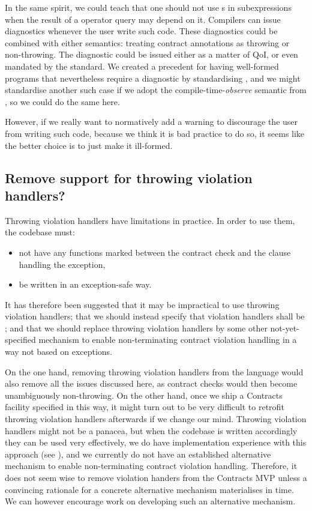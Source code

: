 In the same spirit, we could teach that one should not use s in subexpressions when the result of a  operator query may depend on it. Compilers can issue diagnostics whenever the user write such code. These diagnostics could be combined with either semantics: treating contract annotations as throwing or non-throwing. The diagnostic could be issued either as a matter of QoI, or even mandated by the standard. We created a precedent for having well-formed programs that nevertheless require a diagnostic by standardising , and we might standardise another such case if we adopt the compile-time-\emph{observe} semantic from \cite{P2894R1}, so we could do the same here.

However, if we really want to normatively add a warning to discourage the user from writing such code, because we think it is bad practice to do so, it seems like the better choice is to just make it ill-formed. 

\subsection{Remove support for throwing violation handlers?}

Throwing violation handlers have limitations in practice. In order to use them, the codebase must:
\begin{itemize}
\item not have any functions marked  between the contract check and the  clause handling the exception,
\item be written in an exception-safe way.
\end{itemize}
It has therefore been suggested that it may be impractical to use throwing violation handlers; that we should instead specify that violation handlers shall be ; and that we should replace throwing violation handlers by some other not-yet-specified mechanism to enable non-terminating contract violation handling in a way not based on exceptions.

On the one hand, removing throwing violation handlers from the language would also remove all the issues discussed here, as contract checks would then become unambiguously non-throwing. On the other hand, once we ship a Contracts facility specified in this way, it might turn out to be very difficult to retrofit throwing violation handlers afterwards if we change our mind. Throwing violation handlers might not be a panacea, but when the codebase is written accordingly they can be used very effectively, we do have implementation experience with this approach (see \cite{P2698R0}), and we currently do not have an established alternative mechanism to enable non-terminating contract violation handling. Therefore, it does not seem wise to remove violation handers from the Contracts MVP unless a convincing rationale for a concrete alternative mechanism materialises in time. We can however encourage work on developing such an alternative mechanism.

